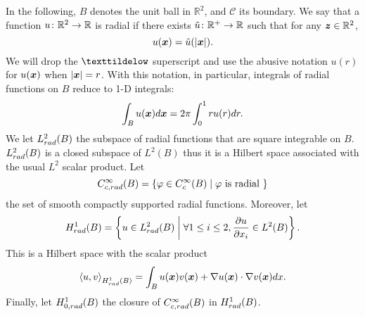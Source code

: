 \documentclass[11pt,a4paper]{article}
\begin{document}
In the following, $B$ denotes the unit ball in $\mathbb{R}^2$, and $\mathcal{C}$ its boundary. We say that a function $u\colon\mathbb{R}^2\rightarrow \mathbb{R}$ is radial if there exists $\tilde{u}\colon\mathbb{R}^+\to \mathbb{R}$ such that for any $\boldsymbol{z} \in \mathbb{R}^2$, 
\[ u(\boldsymbol{x}) = \tilde{u}(\left\lvert \boldsymbol{x} \right\rvert).\] 
We will drop the $\texttildelow$ superscript and use the abusive notation $u(r)$ for $u(\boldsymbol{x})$ when $\left\lvert \boldsymbol{x} \right\rvert = r$. With this notation, in particular, integrals of radial functions on $B$ reduce to 1-D integrals:
\begin{equation}
	\int_{B} u(\boldsymbol{x})d\boldsymbol{x} = 2\pi \int_0^1 r u(r) dr.
\end{equation}
We let $L^2_{rad}(B)$ the subspace of radial functions that are square integrable on $B$. $L^2_{rad}(B)$ is a closed subspace of $L^2(B)$ thus it is a Hilbert space associated with the usual $L^2$ scalar product. 
Let 
\[C^\infty_{c,rad}(B) = \left\{\varphi \in C^{\infty}_c(B)\mathrel{}\middle|\mathrel{}\varphi \text{ is radial }\right\}\]
the set of smooth compactly supported radial functions. Moreover, let
\[H^1_{rad}(B) = \left\{ u \in L^2_{rad}(B)\mathrel{}\middle|\mathrel{} \forall 1 \leq i \leq 2, \dfrac{\partial u}{\partial x_i} \in L^2(B)\right\}.\]
This is a Hilbert space with the scalar product
\[\left\langle u,v\right\rangle_{H^1_{rad}(B)} = \int_{B} u(\boldsymbol{x})v(\boldsymbol{x}) + \nabla u(\boldsymbol{x}) \cdot \nabla v(\boldsymbol{x}) dx.\]
Finally, let $H^1_{0,rad}(B)$ the closure of $C^\infty_{c,rad}(B)$ in $H^1_{rad}(B)$. 
\end{document}
